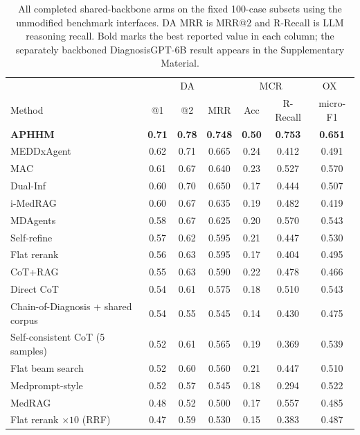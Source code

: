 \documentclass[letterpaper]{article} %
\begin{document}
\begin{table}[t]
\centering
\small
\begin{tabular}{@{}lcccccc@{}}
\toprule
& \multicolumn{3}{c}{DA~\cite{diagnosisarena}} &
\multicolumn{2}{c}{MCR~\cite{medcasereasoning}} &
\multicolumn{1}{c}{OX~\cite{dualinf2025}} \\
Method & @1 & @2 & MRR & Acc & R-Recall & micro-F1 \\
\midrule
\textbf{APHHM} & \textbf{0.71} & \textbf{0.78} & \textbf{0.748} & \textbf{0.50} & \textbf{0.753} & \textbf{0.651} \\
MEDDxAgent & 0.62 & 0.71 & 0.665 & 0.24 & 0.412 & 0.491 \\
MAC & 0.61 & 0.67 & 0.640 & 0.23 & 0.527 & 0.570 \\
Dual-Inf & 0.60 & 0.70 & 0.650 & 0.17 & 0.444 & 0.507 \\
i-MedRAG & 0.60 & 0.67 & 0.635 & 0.19 & 0.482 & 0.419 \\
MDAgents & 0.58 & 0.67 & 0.625 & 0.20 & 0.570 & 0.543 \\
Self-refine & 0.57 & 0.62 & 0.595 & 0.21 & 0.447 & 0.530 \\
Flat rerank & 0.56 & 0.63 & 0.595 & 0.17 & 0.404 & 0.495 \\
CoT+RAG & 0.55 & 0.63 & 0.590 & 0.22 & 0.478 & 0.466 \\
Direct CoT & 0.54 & 0.61 & 0.575 & 0.18 & 0.510 & 0.543 \\
Chain-of-Diagnosis + shared corpus & 0.54 & 0.55 & 0.545 & 0.14 & 0.430 & 0.475 \\
Self-consistent CoT (5 samples) & 0.52 & 0.61 & 0.565 & 0.19 & 0.369 & 0.539 \\
Flat beam search & 0.52 & 0.60 & 0.560 & 0.21 & 0.447 & 0.510 \\
Medprompt-style & 0.52 & 0.57 & 0.545 & 0.18 & 0.294 & 0.522 \\
MedRAG & 0.48 & 0.52 & 0.500 & 0.17 & 0.557 & 0.485 \\
\midrule
Flat rerank $\times 10$ (RRF) & 0.47 & 0.59 & 0.530 & 0.15 & 0.383 & 0.487 \\
\bottomrule
\end{tabular}
\caption{All completed shared-backbone arms on the fixed 100-case subsets using the unmodified benchmark interfaces. DA MRR is MRR@2 and R-Recall is LLM reasoning recall. Bold marks the best reported value in each column; the separately backboned DiagnosisGPT-6B result appears in the Supplementary Material.}
\label{tab:main}

\end{table}
\end{document}
